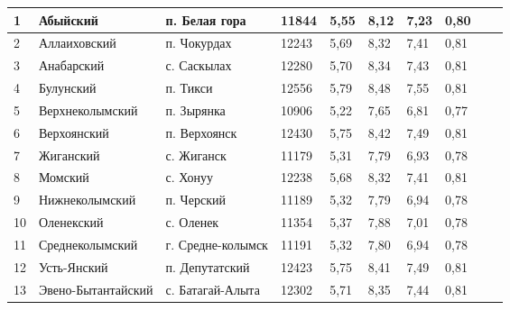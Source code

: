 \begin{landscape}
\begin{center}
\begin{longtable}{|m{5mm}|p{40mm}|p{40mm}|p{30mm}|p{15mm}|p{35mm}|p{35mm}|p{35mm}|p{35mm}|p{35mm}|}
                1   & Абыйский    & п. Белая гора   & 11844   & 5,55    & 8,12    & 7,23    & 0,80 \\ \hline
                2   & Аллаиховский    & п. Чокурдах & 12243   & 5,69    & 8,32    & 7,41    & 0,81 \\ \hline
                3   & Анабарский  & с. Саскылах & 12280   & 5,70    & 8,34    & 7,43    & 0,81 \\ \hline
                4   & Булунский   & п. Тикси    & 12556   & 5,79    & 8,48    & 7,55    & 0,81 \\ \hline
                5   & Верхнеколымский     & п. Зырянка  & 10906   & 5,22    & 7,65    & 6,81    & 0,77 \\ \hline
                6   & Верхоянский     & п. Верхоянск    & 12430   & 5,75    & 8,42    & 7,49    & 0,81 \\ \hline
                7   & Жиганский   & с. Жиганск  & 11179   & 5,31    & 7,79    & 6,93    & 0,78 \\ \hline
                8   & Момский     & с. Хонуу    & 12238   & 5,68    & 8,32    & 7,41    & 0,81 \\ \hline
                9   & Нижнеколымский  & п. Черский  & 11189   & 5,32    & 7,79    & 6,94    & 0,78 \\ \hline
                10  & Оленекский  & с. Оленек   & 11354   & 5,37    & 7,88    & 7,01    & 0,78 \\ \hline
                11  & Среднеколымский     & г. Средне-колымск   & 11191   & 5,32    & 7,80    & 6,94    & 0,78 \\ \hline
                12  & Усть-Янский & п. Депутатский  & 12423   & 5,75    & 8,41    & 7,49    & 0,81 \\ \hline
                13  & Эвено-Бытантайский  & с. Батагай-Алыта    & 12302   & 5,71    & 8,35    & 7,44    & 0,81 \\ 
    
                \hline
            \end{longtable}
        \end{center}
    
\end{landscape}